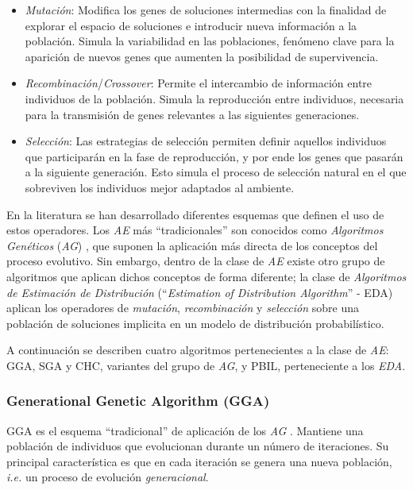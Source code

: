 \begin{itemize}
\item \emph{Mutación}: Modifica los genes de soluciones intermedias con la finalidad de explorar el espacio de soluciones e introducir nueva información a la población. Simula la variabilidad en las poblaciones, fenómeno clave para la aparición de nuevos genes que aumenten la posibilidad de supervivencia.
\item \emph{Recombinación}/\emph{Crossover}: Permite el intercambio de información entre individuos de la población. Simula la reproducción entre individuos, necesaria para la transmisión de genes relevantes a las siguientes generaciones.
\item \emph{Selección}: Las estrategias de selección permiten definir aquellos individuos que participarán en la fase de reproducción, y por ende los genes que pasarán a la siguiente generación. Esto simula el proceso de selección natural en el que sobreviven los individuos mejor adaptados al ambiente.
\end{itemize}

En la literatura se han desarrollado diferentes esquemas que definen el uso de estos operadores. Los \emph{AE} más ``tradicionales'' son conocidos como \emph{Algoritmos Genéticos} (\emph{AG}) \cite{holland1975adaptation}, que suponen la aplicación más directa de los conceptos del proceso evolutivo. Sin embargo, dentro de la clase de \emph{AE} existe otro grupo de algoritmos que aplican dichos conceptos de forma diferente; la clase de \emph{Algoritmos de Estimación de Distribución} (``\emph{Estimation of Distribution Algorithm}'' - EDA) aplican los operadores de \emph{mutación}, \emph{recombinación} y \emph{selección} sobre una población de soluciones implicita en un modelo de distribución probabilístico.

A continuación se describen cuatro algoritmos pertenecientes a la clase de \emph{AE}: GGA, SGA y CHC, variantes del grupo de \emph{AG}, y PBIL, perteneciente a los \emph{EDA}.

\subsubsection{Generational Genetic Algorithm (GGA)}

GGA es el esquema ``tradicional'' de aplicación de los \emph{AG} \cite{back1996evolutionary,Muhlenbein91evolutionin}. Mantiene una población de individuos que evolucionan durante un número de iteraciones. Su principal característica es que en cada iteración se genera una nueva población, \emph{i.e.} un proceso de evolución \emph{generacional}.

